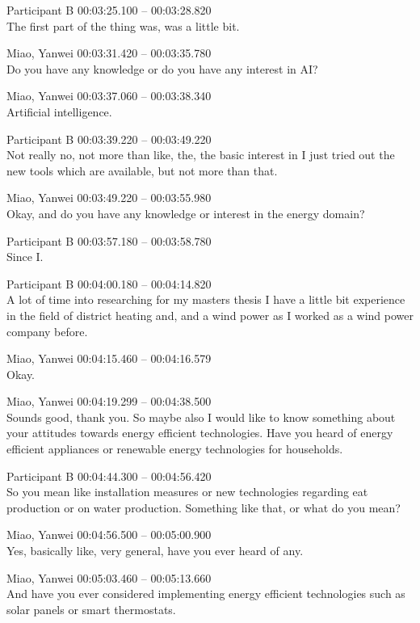 {Participant B 00:03:25.100 -- 00:03:28.820 \\
The first part of the thing was, was a little bit.

Miao, Yanwei 00:03:31.420 -- 00:03:35.780 \\
Do you have any knowledge or do you have any interest in AI?

Miao, Yanwei 00:03:37.060 -- 00:03:38.340 \\
Artificial intelligence.

Participant B 00:03:39.220 -- 00:03:49.220 \\
Not really no, not more than like, the, the basic interest in I just tried out the new tools which are available, but not more than that.

Miao, Yanwei 00:03:49.220 -- 00:03:55.980 \\
Okay, and do you have any knowledge or interest in the energy domain?

Participant B 00:03:57.180 -- 00:03:58.780 \\
Since I.

Participant B 00:04:00.180 -- 00:04:14.820 \\
A lot of time into researching for my masters thesis I have a little bit experience in the field of district heating and, and a wind power as I worked as a wind power company before.

Miao, Yanwei 00:04:15.460 -- 00:04:16.579 \\
Okay.

Miao, Yanwei 00:04:19.299 -- 00:04:38.500 \\
Sounds good, thank you. So maybe also I would like to know something about your attitudes towards energy efficient technologies. Have you heard of energy efficient appliances or renewable energy technologies for households.

Participant B 00:04:44.300 -- 00:04:56.420 \\
So you mean like installation measures or new technologies regarding eat production or on water production. Something like that, or what do you mean?

Miao, Yanwei 00:04:56.500 -- 00:05:00.900 \\
Yes, basically like, very general, have you ever heard of any.

Miao, Yanwei 00:05:03.460 -- 00:05:13.660 \\
And have you ever considered implementing energy efficient technologies such as solar panels or smart thermostats.

}
